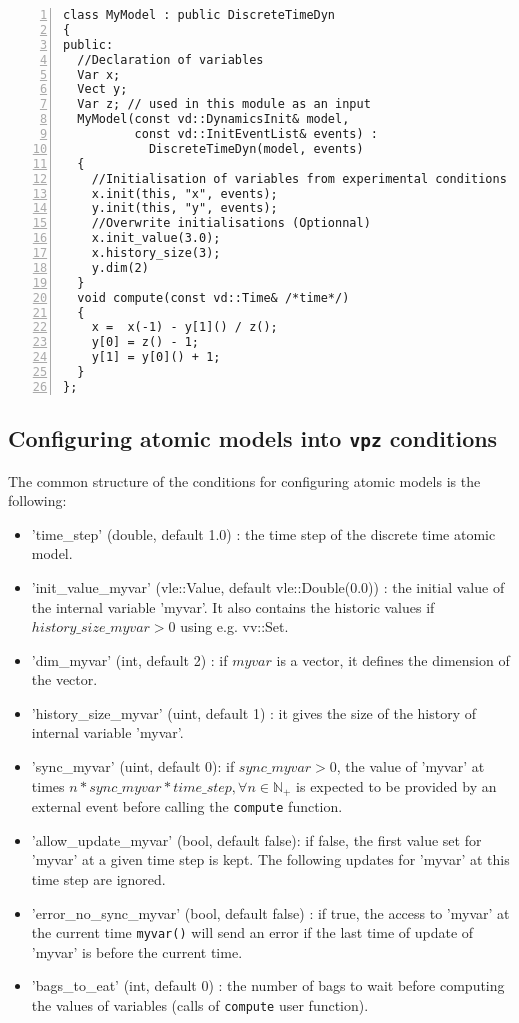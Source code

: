\documentclass{article}
\theoremstyle{remark}
\begin{document}
\clearpage 

\begin{footnotesize}
\begin{lstlisting}[frame=single, numbers=left] 
class MyModel : public DiscreteTimeDyn
{
public:
  //Declaration of variables
  Var x;
  Vect y;
  Var z; // used in this module as an input
  MyModel(const vd::DynamicsInit& model, 
          const vd::InitEventList& events) :
            DiscreteTimeDyn(model, events)
  {
    //Initialisation of variables from experimental conditions
    x.init(this, "x", events);
    y.init(this, "y", events);
    //Overwrite initialisations (Optionnal)
    x.init_value(3.0);
    x.history_size(3);
    y.dim(2)
  }
  void compute(const vd::Time& /*time*/)
  {
    x =  x(-1) - y[1]() / z();
    y[0] = z() - 1;
    y[1] = y[0]() + 1;
  }
};
\end{lstlisting}
\end{footnotesize}

\subsection{Configuring atomic models into {\tt vpz} conditions}
\label{sec:user:conf}

The common structure of the conditions for configuring atomic models is the
following:

\begin{itemize}
  \item 'time\_step' (double, default 1.0) : the time step of the discrete time
  atomic model.
  \item 'init\_value\_myvar' (vle::Value, default vle::Double(0.0)) :
  the initial value of the internal variable 'myvar'. It also contains
  the historic values if $history\_size\_myvar > 0$ using e.g.
  vv::Set.
  \item 'dim\_myvar' (int, default 2) : if $myvar$ is a vector, it defines
  the dimension of the vector.
  \item 'history\_size\_myvar' (uint, default 1) : it gives the size of the
  history of internal variable 'myvar'.
  \item 'sync\_myvar' (uint, default 0): if $sync\_myvar > 0$, the value of
  'myvar' at times $n * sync\_myvar * time\_step, \forall n \in \mathbb{N}_+$ is
  expected to be provided by an external event before calling the {\tt compute}
  function.
  \item 'allow\_update\_myvar' (bool, default false): if false, the first
  value set for 'myvar' at a given time step is kept. The following updates for
  'myvar' at this time step are ignored. 
  \item 'error\_no\_sync\_myvar' (bool, default false) : if true, the
  access to 'myvar' at the current time {\tt myvar()} will send an error if the
  last time of update of 'myvar' is before the current time.
  \item 'bags\_to\_eat' (int, default 0) : the number of bags to wait before
  computing the values of variables (calls of {\tt compute} user function).
\end{itemize} 
\end{document}
